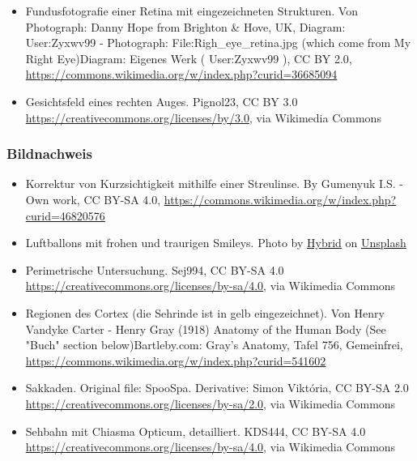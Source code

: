 \documentclass{beamer}
\begin{document}
\begin{frame}
\begin{tiny}
\begin{itemize}
   \item
Fundusfotografie einer Retina mit eingezeichneten Strukturen. Von Photograph: Danny Hope from Brighton \& Hove, UK, Diagram: User:Zyxwv99 - Photograph: File:Righ\_eye\_retina.jpg (which come from My Right Eye)Diagram: Eigenes Werk ( User:Zyxwv99 ), CC BY 2.0,\url{ https://commons.wikimedia.org/w/index.php?curid=36685094}
  
  
 \item
 
 Gesichtsfeld eines rechten Auges. Pignol23, CC BY 3.0 \url{https://creativecommons.org/licenses/by/3.0}, via Wikimedia Commons
 \end{itemize}
\end{tiny}
\end{frame}

 
\begin{frame}
\frametitle{Bildnachweis}
\begin{tiny}



 
\begin{itemize}

  
\item
Korrektur von Kurzsichtigkeit mithilfe einer Streulinse. By Gumenyuk I.S. - Own work, CC BY-SA 4.0, \url{https://commons.wikimedia.org/w/index.php?curid=46820576}

\item
Luftballons mit frohen und traurigen Smileys. Photo by \href{https://unsplash.com/@artbyhybrid?utm_source=unsplash&utm_medium=referral&utm_content=creditCopyText}{Hybrid} on \href{https://unsplash.com/s/photos/feedback?utm_source=unsplash&utm_medium=referral&utm_content=creditCopyText}{Unsplash}

\item
Perimetrische Untersuchung. Sej994, CC BY-SA 4.0 \url{https://creativecommons.org/licenses/by-sa/4.0}, via Wikimedia Commons

\item
Regionen des Cortex (die Sehrinde ist in gelb eingezeichnet). Von Henry Vandyke Carter - Henry Gray (1918) Anatomy of the Human Body (See "Buch" section below)Bartleby.com: Gray's Anatomy, Tafel 756, Gemeinfrei, \url{https://commons.wikimedia.org/w/index.php?curid=541602}

\item
Sakkaden. Original file: SpooSpa. Derivative: Simon Viktória, CC BY-SA 2.0 \url{https://creativecommons.org/licenses/by-sa/2.0}, via Wikimedia Commons

\item
Sehbahn mit Chiasma Opticum, detailliert. KDS444, CC BY-SA 4.0 \url{https://creativecommons.org/licenses/by-sa/4.0}, via Wikimedia Commons


\end{itemize}
\end{tiny}
\end{frame}
\end{document}
